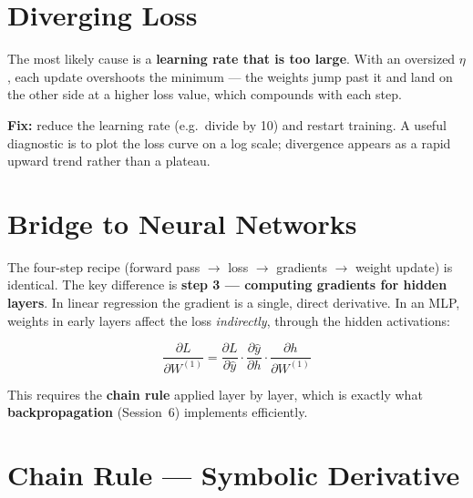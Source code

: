 \documentclass[11pt, a4paper]{article}
\begin{document}
\section{Diverging Loss}

\begin{tcolorbox}[solutionbox]
The most likely cause is a \textbf{learning rate that is too large}. With an
oversized $\eta$, each update overshoots the minimum — the weights jump past it
and land on the other side at a higher loss value, which compounds with each step.

\textbf{Fix:} reduce the learning rate (e.g.\ divide by 10) and restart training.
A useful diagnostic is to plot the loss curve on a log scale; divergence appears
as a rapid upward trend rather than a plateau.
\end{tcolorbox}

\section{Bridge to Neural Networks}

\begin{tcolorbox}[solutionbox]
The four-step recipe (forward pass $\to$ loss $\to$ gradients $\to$ weight update)
is identical. The key difference is \textbf{step 3 — computing gradients for hidden
layers}. In linear regression the gradient is a single, direct derivative. In an
MLP, weights in early layers affect the loss \emph{indirectly}, through the hidden
activations:

$$\frac{\partial L}{\partial W^{(1)}} = \frac{\partial L}{\partial \hat{y}} \cdot \frac{\partial \hat{y}}{\partial h} \cdot \frac{\partial h}{\partial W^{(1)}}$$

This requires the \textbf{chain rule} applied layer by layer, which is exactly what
\textbf{backpropagation} (Session~6) implements efficiently.
\end{tcolorbox}


\section{Chain Rule — Symbolic Derivative}
\end{document}
